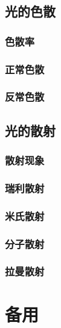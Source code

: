 \documentclass[cn,10pt,chinesefont=founder,math=mtpro2,cite=super,toc=onecol,twoside,openany]{elegantbook}
\begin{document}
\section{光的色散}

\subsection{色散率}

\subsection{正常色散}

\subsection{反常色散}

\section{光的散射}

\subsection{散射现象}

\subsection{瑞利散射}

\subsection{米氏散射}

\subsection{分子散射}

\subsection{拉曼散射}












%
\appendix
\chapter{备用}
\end{document}
